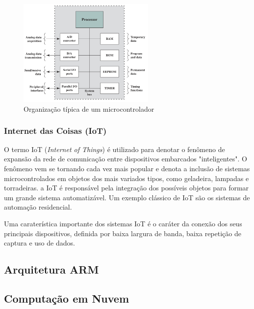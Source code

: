 \documentclass{article}
\begin{document}
\begin{figure}[h]
  \centering
  \includegraphics[width=0.6\textwidth]{uc.png}
  \caption{Organização típica de um microcontrolador}
\end{figure}

\subsubsection{Internet das Coisas (IoT)}
O termo IoT (\textit{Internet of Things}) é utilizado para denotar o
fenômeno de expansão da rede de comunicação entre dispositivos
embarcados "inteligentes". O fenômeno vem se tornando cada vez mais
popular e denota a inclusão de sistemas microcontrolados em objetos
dos mais variados tipos, como geladeira, lampadas e torradeiras. a IoT
é responsável pela integração dos possíveis objetos para formar um
grande sistema automatizável. Um exemplo clássico de IoT são os
sistemas de automação residencial.

Uma caraterística importante dos sistemas IoT é o caráter da conexão
dos seus principais dispositivos, definida por baixa largura de banda,
baixa repetição de captura e uso de dados.

\subsection{Arquitetura ARM} 

\subsection{Computação em Nuvem}
\end{document}
